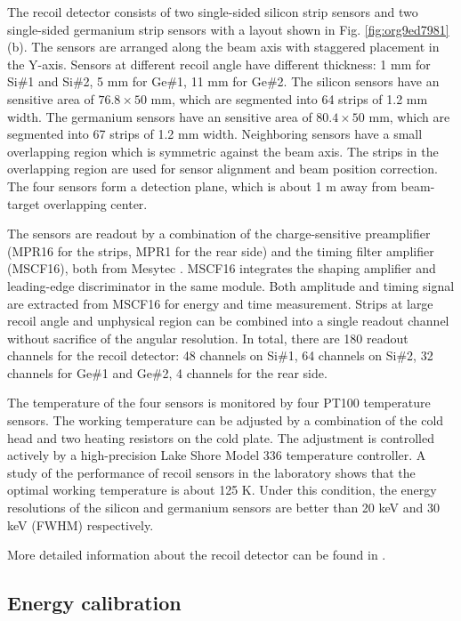 \documentclass[number]{elsarticle}
\begin{document}
The recoil detector consists of two single-sided silicon strip sensors and two single-sided germanium strip sensors with a layout shown in Fig. \ref{fig:org9ed7981} (b).
The sensors are arranged along the beam axis with staggered placement in the Y-axis.
Sensors at different recoil angle have different thickness: 1 mm for Si\#1 and Si\#2, 5 mm for Ge\#1, 11 mm for Ge\#2.
The silicon sensors have an sensitive area of \(76.8 \times 50\) mm, which are segmented into 64 strips of 1.2 mm width.
The germanium sensors have an sensitive area of \(80.4 \times 50\) mm, which are segmented into 67 strips of 1.2 mm width.
Neighboring sensors have a small overlapping region which is symmetric against the beam axis.
The strips in the overlapping region are used for sensor alignment and beam position correction.
The four sensors form a detection plane, which is about 1 m away from beam-target overlapping center.

The sensors are readout by a combination of the charge-sensitive preamplifier (MPR16 for the strips, MPR1 for the rear side) 
and the timing filter amplifier (MSCF16), both from Mesytec \cite{mesytec}. 
MSCF16 integrates the shaping amplifier and leading-edge discriminator in the same module.
Both amplitude and timing signal are extracted from MSCF16 for energy and time measurement.
Strips at large recoil angle and unphysical region can be combined into a single readout channel without sacrifice of the angular resolution.
In total, there are 180 readout channels for the recoil detector: 
48 channels on Si\#1, 64 channels on Si\#2, 32 channels for Ge\#1 and Ge\#2, 4 channels for the rear side. 

The temperature of the four sensors is monitored by four PT100 temperature sensors.
The working temperature can be adjusted by a combination of the cold head and two heating resistors on the cold plate.
The adjustment is controlled actively by a high-precision Lake Shore Model 336 temperature controller.
A study of the performance of recoil sensors in the laboratory shows that the optimal working temperature is about 125 K.
Under this condition, the energy resolutions of the silicon and germanium sensors are better than 20 keV and 30 keV (FWHM) respectively.

More detailed information about the recoil detector can be found in \cite{recoil_article}.

\subsection{Energy calibration}
\label{sec:calibration}
\end{document}
